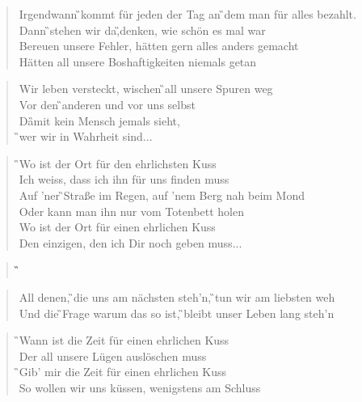 \documentclass[9pt,a4paper,oneside, onecolumn]{article}
\begin{document}
\begin{small}

\begin{verse}
\Em{}Irgendwann \G{}kommt für \D{}jeden der \Em{}Tag an \G{}dem man für \D{}alles \Em{}bezahlt.\\
Dann \G{}stehen wir \D{}da,\Em{}\qquad \G{}denken, wie \D{}schön es mal \Em{}war\\
Be\C{}reuen unsere Fehler, hätten \D{}gern alles anders ge\Em{}macht\\
Hätten \C{}all unsere Boshaftig\D{}keiten niemals ge\Em{}tan\\
\end{verse}

\begin{verse}
Wir leben ver\Em{}steckt, wischen \G{}all unsere \D{}Spuren \Em{}weg\\
Vor den \G{}anderen und \D{}vor uns \Em{}selbst\\
Da\G{}mit kein \D{}Mensch jemals \Em{}sieht,\\
\G{}wer wir in \D{}Wahrheit \C{}sind\D{}...\\
\end{verse}

\begin{verse}
\G{}Wo ist der Ort für den \D{}ehrlichsten Kuss\\
Ich \Am{}weiss, dass ich ihn für \C{}uns finden muss\\
Auf 'ner \G{}Straße im Regen, auf 'nem \D{}Berg nah beim Mond\\
Oder \Am{}kann man ihn nur vom \C{}Totenbett holen\\
\Em{}Wo ist der Ort für einen \D{}ehrlichen Kuss\\
Den \Am{}einzigen, den ich Dir \C{}noch geben muss...\\
\end{verse}
\begin{verse}
\Em{}\qquad \G{}\qquad \D{}\qquad \Em{}\qquad \G{}\qquad \D{}\\
\end{verse}
\begin{verse}
All \Em{}denen, \G{}die uns am \D{}nächsten \Em{}steh'n, \G{}tun wir am \D{}liebsten \Em{}weh\\
Und die \G{}Frage \D{}warum das so \Em{}ist, \G{}bleibt unser \D{}Leben lang \C{}steh'n\D{}\\
\end{verse}

\begin{verse}
\G{}Wann ist die Zeit für einen \D{}ehrlichen Kuss\\
Der \Am{}all unsere Lügen \C{}auslöschen muss\\
\G{}Gib' mir die Zeit für einen \D{}ehrlichen Kuss\\
So \Am{}wollen wir uns küssen, we\C{}nigstens am Schluss\\
\end{verse}


\end{small}
\end{document}
